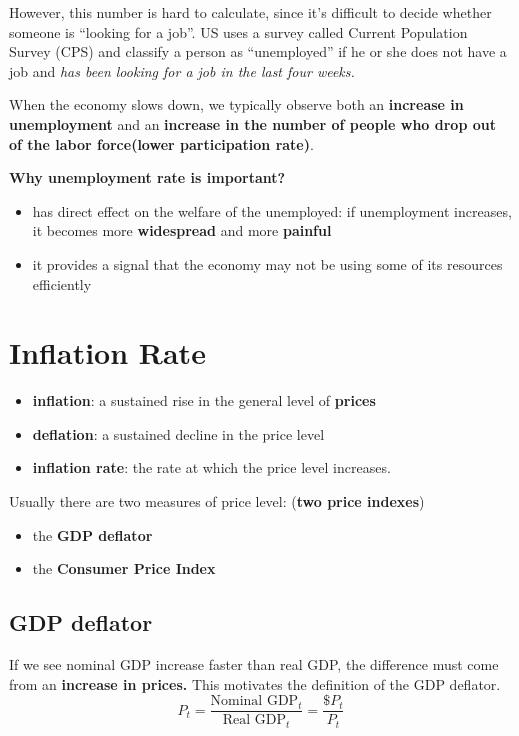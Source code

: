 \documentclass[11pt, a4paper]{ECON2123}
\begin{document}
\begin{spacing}{1.5}
    However, this number is hard to calculate, since it's difficult
    to decide whether someone is ``looking for a job''.
    US uses a survey called Current Population Survey (CPS) 
    and classify a person as ``unemployed'' if he or she does not 
    have a job and {\it has been looking for a job in the last four weeks.}

    When the economy slows down, we typically observe both an 
    {\bf increase in unemployment} and an {\bf increase in the number of people 
    who drop out of the labor force(lower participation rate)}. 

    {\bf Why unemployment rate is important?}
    \begin{itemize}
        \item has direct effect on the welfare of the unemployed: 
        if unemployment increases, it becomes more {\bf widespread} 
        and more {\bf painful}
        \item it provides a signal that the economy may not be 
        using some of its resources efficiently
    \end{itemize}

    \section{Inflation Rate}

    \begin{itemize}
        \item {\bf inflation}: a sustained rise in the general level of {\bf prices}
        \item {\bf deflation}: a sustained decline in the price level
        \item {\bf inflation rate}: the rate at which the price level increases.
    \end{itemize}

    Usually there are two measures of price level: ({\bf two price indexes})
    \begin{itemize}
        \item the {\bf GDP deflator}
        \item the {\bf Consumer Price Index}
    \end{itemize}

    \subsection{GDP deflator}

    If we see nominal GDP increase faster than real GDP, the difference 
    must come from an {\bf increase in prices.} This motivates the 
    definition of the GDP deflator.
    $$P_t=\frac{\text{Nominal GDP}_t}{\text{Real GDP}_t}=\frac{\$ P_t}{P_t}$$


\end{spacing}
\end{document}
